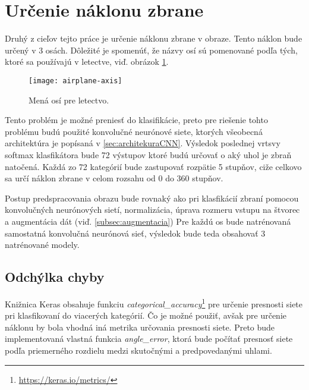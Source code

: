 
\section{Určenie náklonu zbrane}
\label{sec:urcenienaklonuzbrane}
Druhý z cieľov tejto práce je určenie náklonu zbrane v obraze.
Tento náklon bude určený v 3 osách.
Dôležité je spomenúť, že názvy osí sú pomenované podľa tých, ktoré sa používajú v letectve, viď. obrázok \ref{pic:airplaneaxis}.
\begin{figure}[H]
    \centering
    \texttt{[image: airplane-axis]}
    \caption{Mená osí pre letectvo.}
    \label{pic:airplaneaxis}
\end{figure}

Tento problém je možné preniesť do klasifikácie, preto pre riešenie tohto problému budú použité konvolučné neurónové siete, ktorých všeobecná architektúra je popísaná v \ref{sec:architekuraCNN}.
Výsledok poslednej vrtsvy softmax klasfikátora bude 72 výstupov ktoré budú určovať o aký uhol je zbraň natočená.
Každá zo 72 kategórií bude zastupovať rozpätie 5 stupňov, ciže celkovo sa určí náklon zbrane v celom rozsahu od 0 do 360 stupňov.

Postup predspracovania obrazu bude rovnaký ako pri klasfikácií zbraní pomocou konvolučných neurónových sietí, normalizácia, úprava rozmeru vstupu na štvorec a augmentácia dát (viď. \ref{subsec:augmentacia})
Pre každú os bude natrénovaná samostatná konvolučná neurónová sieť, výsledok bude teda obsahovať 3 natrénované modely.

\subsection{Odchýlka chyby}
\label{subsec:odchylkachyby}
Knižnica Keras obsahuje funkciu \textit{categorical\_accuracy}\footnote{\url{https://keras.io/metrics/}} pre určenie presnosti siete pri klasfikovaní do viacerých kategórií.
Čo je možné použiť, avšak pre určenie náklonu by bola vhodná iná metrika určovania presnosti siete.
Preto bude implementovaná vlastná funkcia \textit{angle\_error}, ktorá bude počítať presnosť siete podľa priemerného rozdielu medzi skutočnými a predpovedanými uhlami.
